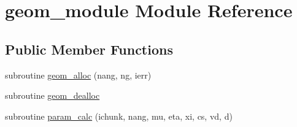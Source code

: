 \hypertarget{classgeom__module}{\section{geom\-\_\-module Module Reference}
\label{classgeom__module}
}
\subsection*{Public Member Functions}
\begin{DoxyCompactItemize}
\item 
subroutine \hyperlink{classgeom__module_ac4ae76d14c7253c3c87ae0f55b1d4b1a}{geom\-\_\-alloc} (nang, ng, ierr)
\item 
subroutine \hyperlink{classgeom__module_ab2401a2eca471da4ca28fe634b5350d4}{geom\-\_\-dealloc}
\item 
subroutine \hyperlink{classgeom__module_aa09319572e809c686211758ef5fb129e}{param\-\_\-calc} (ichunk, nang, mu, eta, xi, cs, vd, d)
\end{DoxyCompactItemize}
